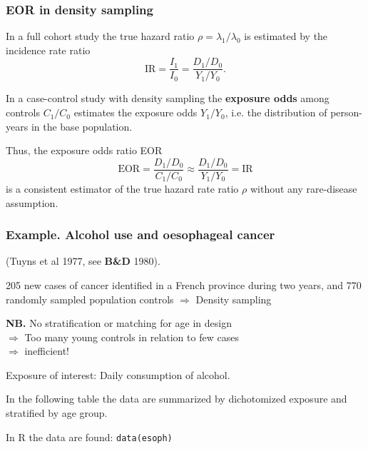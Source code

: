 \documentclass[handout,12pt]{beamer}
\begin{document}
\begin{frame} \frametitle{EOR in density sampling}

\bi
\item
 In a full cohort
study the true hazard ratio
$\rho = \lambda_1 / \lambda_0 $ 
is estimated by the incidence rate ratio 
$$  \text{IR} = \frac{I_1} {I_0} = \frac{D_1 / D_0 }{ Y_1 / Y_0} . $$
\item
In a case-control study with density sampling 
the {\bf exposure odds} among controls
$C_1/C_0$ estimates the {exposure odds} $Y_1/Y_0$, i.e.
the distribution of  person-years %
 in the base population.
\medskip
\item
Thus, the exposure odds ratio EOR
$$ \text{EOR} = \frac{D_1 / D_0 }{ C_1 / C_0} \approx 
  \frac{D_1 / D_0 }{ Y_1 / Y_0} = \text{IR} $$
is a consistent estimator of the true hazard rate ratio
  $\rho$ without any rare-disease assumption.
\ei  
\end{frame} 


\begin{frame}
 \frametitle{Example. Alcohol use and oesophageal cancer}
 (Tuyns et al 1977, see {\bf B\&D} 1980).

\bi
\item
205 new cases of cancer identified in a French province 
during two years, 
and 770 randomly sampled population
controls $\Rightarrow$ Density sampling
\item
{\bf NB.} No stratification or matching for age in design \\ 
$\Rightarrow$
Too many young controls in relation to few cases \\
$\Rightarrow$  inefficient! 
\medskip\item
Exposure of interest: Daily consumption of alcohol.
\medskip\item
In the following table the data are summarized by dichotomized 
exposure and stratified by age group.
\medskip\item
In R the data are found: {\tt data(esoph)}
\ei 
\end{frame} 
\end{document}
